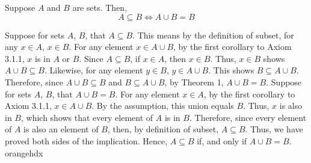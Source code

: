 \begin{exercise}
    {}Suppose \(A\) and \(B\) are sets. Then, 
    \[A\subseteq B \iff A \cup B = B\]
\end{exercise}

\iffpf
    {Suppose for sets \(A\), \(B\), that \(A\subseteq B\). This means by the definition of subset, for any \(x\in A\), \(x\in B\). For any element \(x \in A\cup B\), by the first corollary to Axiom 3.1.1, \(x\) is in \(A\) or \(B\). Since \(A\subseteq B\), if \(x\in A\), then \(x\in B\). Thus, \(x\in B\) shows \(A\cup B \subseteq B\). Likewise, for any element \(y \in B\), \(y\in A\cup B\). This shows \(B \subseteq A\cup B\). Therefore, since \(A\cup B\subseteq B\) and \(B\subseteq A\cup B\), by Theorem 1, \(A \cup B = B\).}
    {Suppose for sets \(A\), \(B\), that \(A \cup B = B\). For any element \(x\in A\), by the first corollary to Axiom 3.1.1, \(x\in A\cup B\). By the assumption, this union equals \(B\). Thus, \(x\) is also in \(B\), which shows that every element of \(A\) is in \(B\). Therefore, since every element of \(A\) is also an element of \(B\), then, by definition of subset, \(A\subseteq B\).}
    {Thus, we have proved both sides of the implication. Hence, \(A \subseteq B\) if, and only if \(A \cup B = B\).}
    {orangehdx}